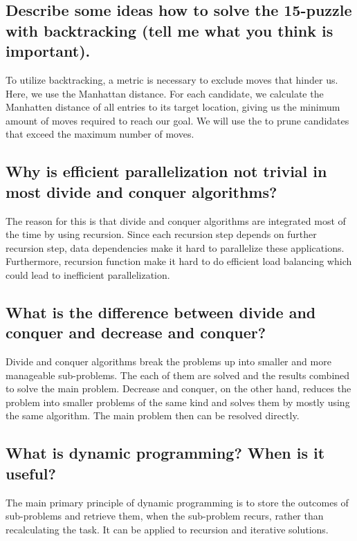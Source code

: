 \documentclass[runningheads]{llncs}
\begin{document}
\subsection*{Describe some ideas how to solve the 15-puzzle with backtracking (tell me what you think is important).}
To utilize backtracking, a metric is necessary to exclude moves that hinder us. Here, we use the Manhattan distance. For each candidate, we calculate the
Manhatten distance of all entries to its target location, giving us the minimum amount of moves required to reach our goal. We will use the to prune
candidates that exceed the maximum number of moves.

\subsection*{Why is efficient parallelization not trivial in most divide and conquer algorithms?}
The reason for this is that divide and conquer algorithms are integrated most of the time by using recursion. Since each recursion step depends on
further recursion step, data dependencies make it hard to parallelize these applications. Furthermore, recursion function make it hard to do efficient
load balancing which could lead to inefficient parallelization.

\subsection*{What is the difference between divide and conquer and decrease and conquer?}
Divide and conquer algorithms break the problems up into smaller and more manageable sub-problems. The each of them are solved and the results combined
to solve the main problem. Decrease and conquer, on the other hand, reduces the problem into smaller problems of the same kind and solves them by mostly
using the same algorithm. The main problem then can be resolved directly.

\subsection*{What is dynamic programming? When is it useful?}
The main primary principle of dynamic programming is to store the outcomes of sub-problems and retrieve them, when the sub-problem recurs, rather than recalculating the
task. It can be applied to recursion and iterative solutions.
\end{document}
